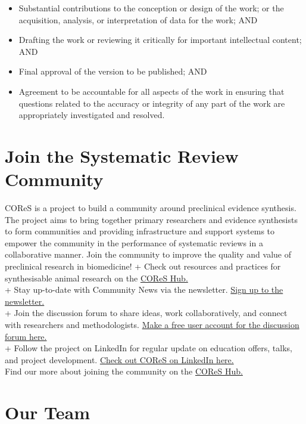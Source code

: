 \documentclass[
]{book}
\providecommand{\tightlist}{%
  \setlength{\itemsep}{0pt}\setlength{\parskip}{0pt}}
\begin{document}
\begin{itemize}
\tightlist
\item
  Substantial contributions to the conception or design of the work; or the acquisition, analysis, or interpretation of data for the work; AND
\item
  Drafting the work or reviewing it critically for important intellectual content; AND
\item
  Final approval of the version to be published; AND
\item
  Agreement to be accountable for all aspects of the work in ensuring that questions related to the accuracy or integrity of any part of the work are appropriately investigated and resolved.
\end{itemize}

\section{Join the Systematic Review Community}\label{join-the-systematic-review-community}

COReS is a project to build a community around preclinical evidence synthesis. The project aims to bring together primary researchers and evidence synthesists to form communities and providing infrastructure and support systems to empower the community in the performance of systematic reviews in a collaborative manner. Join the community to improve the quality and value of preclinical research in biomedicine!
+ Check out resources and practices for synthesisable animal research on the \href{www.cores-hub.io}{COReS Hub.}\\
+ Stay up-to-date with Community News via the newsletter. \href{http://eepurl.com/h4hsMv}{Sign up to the newsletter.}\\
+ Join the discussion forum to share ideas, work collaboratively, and connect with researchers and methodologists. \href{www.cores.zulipchat.com}{Make a free user account for the discussion forum here.}\\
+ Follow the project on LinkedIn for regular update on education offers, talks, and project development. \href{https://www.linkedin.com/company/communities-for-open-research-synthesis/}{Check out COReS on LinkedIn here.}\\
Find our more about joining the community on the \href{https://cores-hub.io/cores-join-the-community/}{COReS Hub.}

\section{Our Team}\label{our-team}
\end{document}
